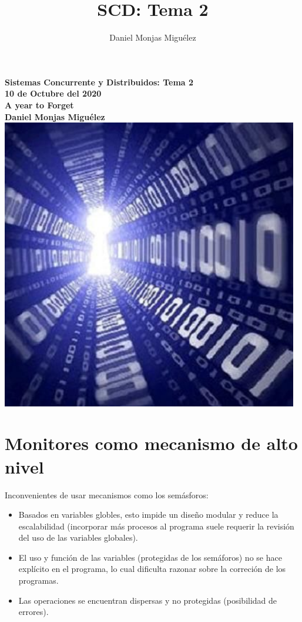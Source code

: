 \documentclass[a4paper,11pt]{article}
\author{Daniel Monjas Miguélez}
\title{SCD: Tema 2}
\begin{document}
\begin{titlepage}
\centering
    \vfill
    {\bfseries\Large
        Sistemas Concurrente y Distribuidos: Tema 2\\
        10 de Octubre del 2020\\
        A year to Forget \\
        \vskip2cm
        Daniel Monjas Miguélez\\
    }    
    \vfill
    \includegraphics[width=13cm]{binario.jpg}
    \vfill
    \vfill
\end{titlepage}

\newpage
\tableofcontents
\newpage

\section{Monitores como mecanismo de alto nivel}
Inconvenientes de usar mecanismos como los semásforos:
\begin{itemize}
\item Basados en variables globles, esto impide un diseño modular y reduce la escalabilidad (incorporar más procesos al programa suele requerir la revisión del uso de las variables globales).

\item El uso y función de las variables (protegidas de los semáforos) no se hace explícito en el programa, lo cual dificulta razonar sobre la correción de los programas.

\item Las operaciones se encuentran dispersas y no protegidas (posibilidad de errores).
\end{itemize}
\end{document}
